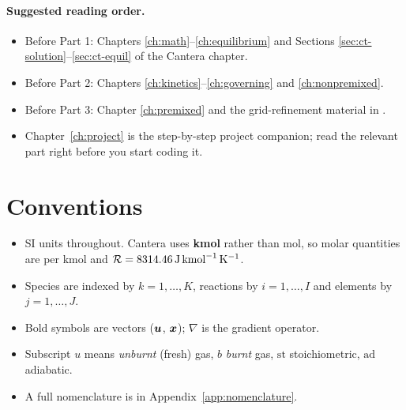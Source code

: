 \paragraph{Suggested reading order.}
\begin{itemize}
  \item Before Part 1: Chapters \ref{ch:math}--\ref{ch:equilibrium} and Sections
        \ref{sec:ct-solution}--\ref{sec:ct-equil} of the Cantera chapter.
  \item Before Part 2: Chapters \ref{ch:kinetics}--\ref{ch:governing} and \ref{ch:nonpremixed}.
  \item Before Part 3: Chapter \ref{ch:premixed} and the grid-refinement material in
        .
  \item Chapter~\ref{ch:project} is the step-by-step project companion; read the relevant part
        right before you start coding it.
\end{itemize}

\section{Conventions}

\begin{itemize}
  \item SI units throughout. Cantera uses \textbf{kmol} rather than mol, so molar quantities
        are per kmol and $\mathcal{R} = \SI{8314.46}{\joule\per\kilo\mole\per\kelvin}$.
  \item Species are indexed by $k=1,\dots,K$, reactions by $i=1,\dots,I$ and elements by
        $j=1,\dots,J$.
  \item Bold symbols are vectors ($\bm{u}$, $\bm{x}$); $\nabla$ is the gradient operator.
  \item Subscript $u$ means \emph{unburnt} (fresh) gas, $b$ \emph{burnt} gas, $\mathrm{st}$ stoichiometric,
        $\mathrm{ad}$ adiabatic.
  \item A full nomenclature is in Appendix~\ref{app:nomenclature}.
\end{itemize}

